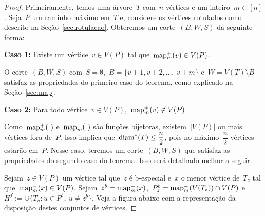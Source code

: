 		\begin{proof}
		Primeiramente, temos uma árvore~$T$ com~${n}$ vértices e um 
		inteiro~${m\in[n]}$.
		Seja~$P$ um caminho máximo em~$T$ e, considere os vértices
		rotulados como descrito na Seção~\ref{sec:rotulacao}.
		Obteremos um corte~$(B,W,S)$ da seguinte forma:
		\bigskip
		\bigskip

		\textbf{Caso 1:}
			Existe um vértice~${v\in V(P)}$ tal 
			que~${\mathrm{map}_m^+(v)\in V(P)}$. 
			
			O corte~$(B,W,S)$ 
			com~${S=\emptyset}$,~${B =\{v+1, v+2,\ldots,~v+m\}}$
			e~${W=V(T)\setminus B}$ satisfaz as propriedades do
			primeiro caso do teorema,
			como explicado na Seção~\ref{sec:map}.

	\bigskip
	\bigskip

		\textbf{Caso 2:}
			Para todo vértice~${v\in V(P)}$,~${\mathrm{map}_m^+(v)\not\in V(P)}$.

			Como~$\mathrm{map}_m^+(\ )$ e~$\mathrm{map}_m^-(\ )$ são funções bijetoras, 
			existem~$|V(P)|$ ou mais vértices fora de~$P$.
			Isso implica que~$\mathrm{diam}^*(T)\le\dfrac{n}{2}$, pois no 
			máximo~$\dfrac{n}{2}$ vértices estarão em~$P$.
			Nesse caso, teremos um corte~$(B,W,S)$ que satisfaz as
			propriedades do segundo caso do teorema.
			Isso será detalhado melhor a seguir.

			\bigskip
			

			Sejam~${z\in V(P)}$ um vértice tal que~$z$ é b-especial 
			e~$x$ o menor vértice de~$T_z$ tal 
			que~${\mathrm{map}^-_m(x)\in V(P)}$. 
			Sejam~${z^b = \mathrm{map}^-_m(x)}$,~${P_z^b = \mathrm{map}^-_m(V(T_z))\cap V(P)}$
			e~$H_z^f:= \cup\{T_u: u\in P^b_z,\ u\ne z^b \}$.
			Veja a figura abaixo com a representação da disposição destes 
			conjuntos de vértices.


\end{proof}
